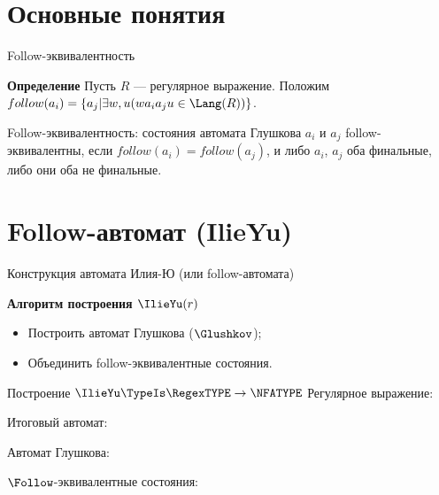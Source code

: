 \section{Основные понятия}
\begin{frame}{Follow-эквивалентность}
  \begin{block}{\bf Определение}
    Пусть $R$ --- регулярное выражение. Положим $follow(a_{i}) = \{a_{j} | \exists w, u(wa_{i}a_{j}u \in\Lang(R))\}$.

    Follow-эквивалентность: состояния автомата Глушкова $a_{i}$ и $a_{j}$ follow-эквивалентны, если $follow(a_{i}) = follow(a_{j})$, и либо $a_{i}$, $a_{j}$ оба финальные, либо они оба не финальные.
  \end{block} %
\end{frame}


\section{Follow-автомат (IlieYu)}
\begin{frame}{Конструкция автомата Илия-Ю (или follow-автомата)}
  \begin{block}{\bf Алгоритм построения $\IlieYu(r)$}
    \begin{itemize}
      \item Построить автомат Глушкова ($\Glushkov$);
      \item Объединить follow-эквивалентные состояния.
    \end{itemize}
  \end{block} %
\end{frame}

\begin{frame}{Построение $\IlieYu\TypeIs\RegexTYPE\to\NFATYPE$}
	Регулярное выражение:

	Итоговый автомат:


	Автомат Глушкова:


	$\Follow$-эквивалентные состояния:


\end{frame}


